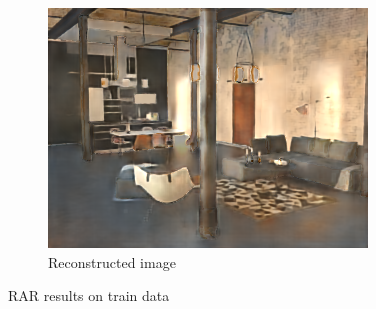 \begin{figure}[H]
\begin{subfigure}{0.32\linewidth}
        \includegraphics[width=\linewidth]{praca/images/AI46_009_Cam06.reconstructed.png}
        \caption{Reconstructed image}
    \end{subfigure}
    \caption[RAR results - train data]{RAR results on train data}
    \label{fig:rar-train}
\end{figure}
